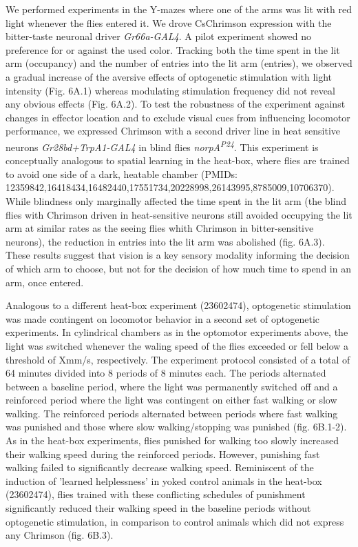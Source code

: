 \documentclass[10pt]{article}
\begin{document}
\begin{multicols}{2}
We performed experiments in the Y-mazes where one of the arms was lit with red light whenever the flies entered it. We drove CsChrimson expression with the bitter-taste neuronal driver \textit{Gr66a-GAL4}. A pilot experiment showed no preference for or against the used color. Tracking both the time spent in the lit arm (occupancy) and the number of entries into the lit arm (entries), we observed a gradual increase of the aversive effects of optogenetic stimulation with light intensity (Fig. 6A.1) whereas modulating stimulation frequency did not reveal any obvious effects (Fig. 6A.2). To test the robustness of the experiment against changes in effector location and to exclude visual cues from influencing locomotor performance, we expressed Chrimson with a second driver line in heat sensitive neurons \textit{Gr28bd+TrpA1-GAL4} in blind flies \textit{norpA\textsuperscript{P24}}. This experiment is conceptually analogous to spatial learning in the heat-box, where flies are trained to avoid one side of a dark, heatable chamber (PMIDs: 12359842,16418434,16482440,17551734,20228998,26143995,8785009,10706370). While blindness only marginally affected the time spent in the lit arm (the blind flies with Chrimson driven in heat-sensitive neurons still avoided occupying the lit arm at similar rates as the seeing flies whith Chrimson in bitter-sensitive neurons), the reduction in entries into the lit arm was abolished (fig. 6A.3). These results suggest that vision is a key sensory modality informing the decision of which arm to choose, but not for the decision of how much time to spend in an arm, once entered.

Analogous to a different heat-box experiment (23602474), optogenetic stimulation was made contingent on locomotor behavior in a second set of optogenetic experiments. In cylindrical chambers as in the optomotor experiments above, the light was switched whenever the waling speed of the flies exceeded or fell below a threshold of Xmm/s, respectively. The experiment protocol consisted of a total of 64 minutes divided into 8 periods of 8 minutes each. The periods alternated between a baseline period, where the light was permanently switched off and a reinforced period where the light was contingent on either fast walking or slow walking. The reinforced periods alternated between periods where fast walking was punished and those where slow walking/stopping was punished (fig. 6B.1-2). As in the heat-box experiments, flies punished for walking too slowly increased their walking speed during the reinforced periods. However, punishing fast walking failed to significantly decrease walking speed. Reminiscent of the induction of 'learned helplessness' in yoked control animals in the heat-box (23602474), flies trained with these conflicting schedules of punishment significantly reduced their walking speed in the baseline periods without optogenetic stimulation, in comparison to control animals which did not express any Chrimson (fig. 6B.3).



\end{multicols}
\end{document}
